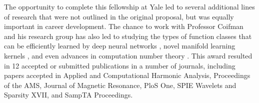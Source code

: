 The opportunity to complete this fellowship at Yale led to several additional lines of research that were not outlined in the original proposal, but was equally important in career development. %
The chance to work with Professor Coifman and his research group has also led to studying the types of function classes that can be efficiently learned by deep neural networks \cite{shaham2016provable}, novel manifold learning kernels \cite{cloninger2017spectral}, and even advances in computation number theory \cite{cloninger2017suprema}.  
This award resulted in 12 accepted or submitted publications in a number of journals, including papers accepted in
Applied and Computational Harmonic Analysis,
Proceedings of the AMS,
Journal of Magnetic Resonance,
PloS One,
SPIE Wavelets and Sparsity XVII, 
and SampTA Proceedings.
\iffalse
This award also provided the ability to travel to a number of conferees to disseminate the information, including
SampTA 2015,
SPIE 2017,
workshop at Banff International Research Station 2015,
workshop at Casa Mathematica Oaxaca 2016,
a talk at Institute for Mathematics and Applications 2016,
and a talk at The Chicago Chapter of the American Statistical Association 2017.
\fi

